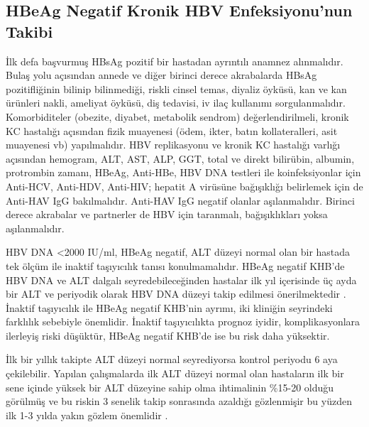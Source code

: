 \begin{table}
\begin{minipage}[c]{\textwidth}
\begin{threeparttable}
\begin{tablenotes}
\end{tablenotes}
\end{threeparttable}
\end{minipage}
\end{table}


\newpage

\subsection{HBeAg Negatif Kronik HBV Enfeksiyonu'nun Takibi}

İlk defa başvurmuş HBsAg pozitif bir hastadan ayrıntılı anamnez alınmalıdır. Bulaş yolu açısından annede ve diğer birinci derece akrabalarda HBsAg pozitifliğinin bilinip bilinmediği, riskli cinsel temas, diyaliz öyküsü, kan ve kan ürünleri nakli, ameliyat öyküsü, diş tedavisi, iv ilaç kullanımı sorgulanmalıdır. Komorbiditeler (obezite, diyabet, metabolik sendrom) değerlendirilmeli, kronik KC hastalığı açısından fizik muayenesi (ödem, ikter, batın kollateralleri, asit muayenesi vb) yapılmalıdır. HBV replikasyonu ve kronik KC hastalığı varlığı açısından hemogram, ALT, AST, ALP, GGT, total ve direkt bilirübin, albumin, protrombin zamanı, HBeAg, Anti-HBe, HBV DNA testleri ile koinfeksiyonlar için Anti-HCV, Anti-HDV, Anti-HIV; hepatit A virüsüne bağışıklığı belirlemek için de Anti-HAV IgG bakılmalıdır. Anti-HAV IgG negatif olanlar aşılanmalıdır. Birinci derece akrabalar ve partnerler de HBV için taranmalı, bağışıklıkları yoksa aşılanmalıdır. 


HBV DNA <2000 IU/ml, HBeAg negatif, ALT düzeyi normal olan bir hastada tek ölçüm ile inaktif taşıyıcılık tanısı konulmamalıdır. HBeAg negatif KHB'de HBV DNA ve ALT dalgalı seyredebileceğinden hastalar ilk yıl içerisinde üç ayda bir ALT ve periyodik olarak HBV DNA düzeyi takip edilmesi önerilmektedir \cite{european2017easl}. İnaktif taşıyıcılık ile HBeAg negatif KHB'nin ayrımı, iki kliniğin seyrindeki farklılık sebebiyle önemlidir. İnaktif taşıyıcılıkta prognoz iyidir, komplikasyonlara ilerleyiş riski düşüktür, HBeAg negatif KHB'de ise bu risk daha yüksektir. 


İlk bir yıllık takipte ALT düzeyi normal seyrediyorsa kontrol periyodu 6 aya çekilebilir. Yapılan çalışmalarda ilk ALT düzeyi normal olan hastaların ilk bir sene içinde yüksek bir ALT düzeyine sahip olma ihtimalinin \%15-20 olduğu görülmüş ve bu riskin 3 senelik takip sonrasında azaldığı gözlenmişir bu yüzden ilk 1-3 yılda yakın gözlem önemlidir \cite{papatheodoridis2012follow,papatheodoridis2008longitudinal}. 


